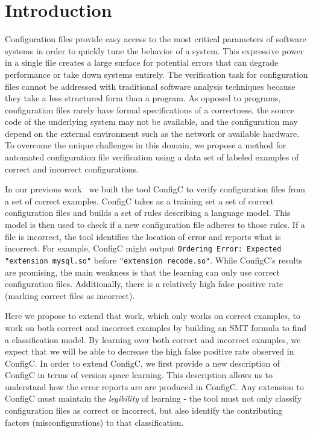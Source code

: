 \section{Introduction}

Configuration files provide easy access to the most critical parameters of software systems in order to quickly tune the behavior of a system.
This expressive power in a single file creates a large surface for potential errors that can degrade performance or take down systems entirely.
The verification task for configuration files cannot be addressed with traditional software analysis techniques because they take a less structured form than a program.
As opposed to programs, configuration files rarely have formal specifications of a correctness, 
  the source code of the underlying system may not be available, 
  and the configuration may depend on the external environment such as the network or available hardware.
To overcome the unique challenges in this domain, we propose a method for automated configuration file verification using a data set of labeled examples of correct and incorrect configurations.

In our previous work~\cite{Santolucito2016} we built the tool ConfigC to verify configuration files from a set of correct examples.
ConfigC takes as a training set a set of correct configuration files and builds a set of rules describing a language model.
This model is then used to check if a new configuration file adheres to those rules.
If a file is incorrect, the tool identifies the location of error and reports what is incorrect.
For example, ConfigC might output \texttt{Ordering Error: Expected "extension mysql.so"} before \texttt{"extension recode.so"}.
While ConfigC's results are promising, the main weakness is that the learning can only use correct configuration files.
Additionally, there is a relatively high false positive rate (marking correct files as incorrect).

Here we propose to extend that work, which only works on correct examples, to work on both correct and incorrect examples by building an SMT formula to find a classification model.
By learning over both correct and incorrect examples, we expect that we will be able to decrease the high false positive rate observed in ConfigC.
In order to extend ConfigC, we first provide a new description of ConfigC in terms of version space learning.
This description allows us to understand how the error reports are are produced in ConfigC.
Any extension to ConfigC must maintain the \textit{legibility} of learning - the tool must not only classify configuration files as correct or incorrect, but also identify the contributing factors (misconfigurations) to that classification.

